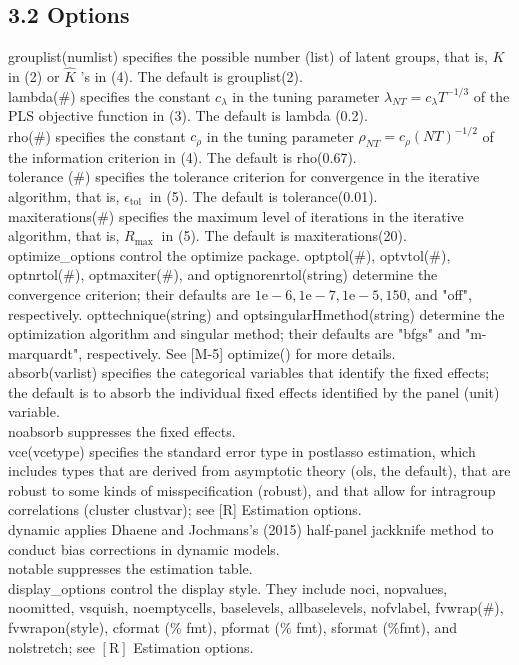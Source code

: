 \documentclass[10pt]{article}
\begin{document}
\subsection*{3.2 Options}
grouplist(numlist) specifies the possible number (list) of latent groups, that is, $K$ in (2) or $\widehat{K}$ 's in (4). The default is grouplist(2).\\
lambda(\#) specifies the constant $c_{\lambda}$ in the tuning parameter $\lambda_{N T}=c_{\lambda} T^{-1 / 3}$ of the PLS objective function in (3). The default is lambda (0.2).\\
rho(\#) specifies the constant $c_{\rho}$ in the tuning parameter $\rho_{N T}=c_{\rho}(N T)^{-1 / 2}$ of the information criterion in (4). The default is rho(0.67).\\
tolerance (\#) specifies the tolerance criterion for convergence in the iterative algorithm, that is, $\epsilon_{\text {tol }}$ in (5). The default is tolerance(0.01).\\
maxiterations(\#) specifies the maximum level of iterations in the iterative algorithm, that is, $R_{\text {max }}$ in (5). The default is maxiterations(20).\\
optimize\_options control the optimize package. optptol(\#), optvtol(\#), optnrtol(\#), optmaxiter(\#), and optignorenrtol(string) determine the convergence criterion; their defaults are $1 \mathrm{e}-6,1 \mathrm{e}-7,1 \mathrm{e}-5,150$, and "off", respectively. opttechnique(string) and optsingularHmethod(string) determine the optimization algorithm and singular method; their defaults are "bfgs" and "m-marquardt", respectively. See [M-5] optimize() for more details.\\
absorb(varlist) specifies the categorical variables that identify the fixed effects; the default is to absorb the individual fixed effects identified by the panel (unit) variable.\\
noabsorb suppresses the fixed effects.\\[0pt]
vce(vcetype) specifies the standard error type in postlasso estimation, which includes types that are derived from asymptotic theory (ols, the default), that are robust to some kinds of misspecification (robust), and that allow for intragroup correlations (cluster clustvar); see [R] Estimation options.\\
dynamic applies Dhaene and Jochmans's (2015) half-panel jackknife method to conduct bias corrections in dynamic models.\\
notable suppresses the estimation table.\\
display\_options control the display style. They include noci, nopvalues, noomitted, vsquish, noemptycells, baselevels, allbaselevels, nofvlabel, fvwrap(\#), fvwrapon(style), cformat (\% fmt), pformat (\% fmt), sformat (\%fmt), and nolstretch; see $[\mathrm{R}]$ Estimation options.
\end{document}
